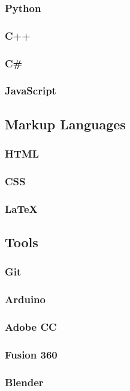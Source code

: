 \documentclass{article}
\begin{document}
\begin{multicols}{2}
        \subsubsection{Python}
        \subsubsection{C++}
        \subsubsection{C\#}
        \subsubsection{JavaScript}
        \subsection{Markup Languages}
            \subsubsection{HTML}
            \subsubsection{CSS}
            \subsubsection{LaTeX}
        \subsection{Tools}
            \subsubsection{Git}
            \subsubsection{Arduino}
            \subsubsection{Adobe CC}
            \subsubsection{Fusion 360}
            \subsubsection{Blender}

\end{multicols}
\end{document}
